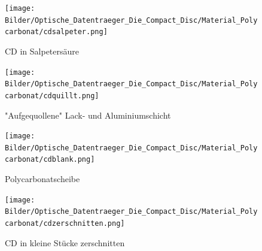 \begin{figure}[h]
    \begin{center}
        \begin{minipage}[t]{0.4\textwidth}
            \begin{center}
                \texttt{[image: Bilder/Optische\_Datentraeger\_Die\_Compact\_Disc/Material\_Polycarbonat/cdsalpeter.png]}
                \caption[CD in Salpetersäure]{CD in Salpetersäure}
                \label{fig:cdsalpeter}
            \end{center}
        \end{minipage}
        \hspace{0.025\textwidth}
        \begin{minipage}[t]{0.4\textwidth}
            \begin{center}
                \texttt{[image: Bilder/Optische\_Datentraeger\_Die\_Compact\_Disc/Material\_Polycarbonat/cdquillt.png]}
                \caption["Aufgequollene" Lack- und Aluminiumschicht]{"Aufgequollene" Lack- und Aluminiumschicht}
                \label{fig:cdquillt}
            \end{center}
        \end{minipage}
    \end{center}

    \begin{center}
        \begin{minipage}[t]{0.4\textwidth}
            \begin{center}
                \texttt{[image: Bilder/Optische\_Datentraeger\_Die\_Compact\_Disc/Material\_Polycarbonat/cdblank.png]}
                \caption[Polycarbonatscheibe]{Polycarbonatscheibe}
                \label{fig:cdblank}
            \end{center}
        \end{minipage}
        \hspace{0.025\textwidth}
        \begin{minipage}[t]{0.4\textwidth}
            \begin{center}
                \texttt{[image: Bilder/Optische\_Datentraeger\_Die\_Compact\_Disc/Material\_Polycarbonat/cdzerschnitten.png]}
                \caption[CD in kleine Stücke zerschnitten]{CD in kleine Stücke zerschnitten}
                \label{fig:cdzerschnitten}
            \end{center}
        \end{minipage}
    \end{center}
\end{figure}


